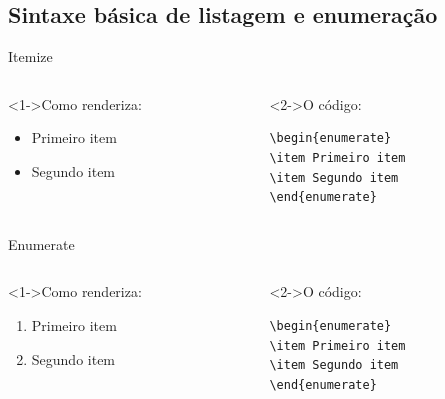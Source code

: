 \documentclass[bigger]{beamer}
\begin{document}
\subsection{Sintaxe básica de listagem e enumeração}
\label{sec:org2bd4bd1}
\begin{frame}[label={sec:org839df62},fragile]{Itemize}
 \begin{columns}
\begin{column}{0.48\columnwidth}
\begin{block}<1->{Como renderiza:}
\begin{itemize}
\item Primeiro item
\item Segundo item
\end{itemize}
\end{block}
\end{column}

\begin{column}{0.48\columnwidth}
\begin{block}<2->{O código:}
\begin{verbatim}
\begin{enumerate}
\item Primeiro item
\item Segundo item
\end{enumerate}
\end{verbatim}
\end{block}
\end{column}
\end{columns}
\end{frame}


\begin{frame}[label={sec:orgb5285ec},fragile]{Enumerate}
 \begin{columns}
\begin{column}{0.48\columnwidth}
\begin{block}<1->{Como renderiza:}
\begin{enumerate}
\item Primeiro item
\item Segundo item
\end{enumerate}
\end{block}
\end{column}
\begin{column}{0.48\columnwidth}
\begin{block}<2->{O código:}
\begin{verbatim}
\begin{enumerate}
\item Primeiro item
\item Segundo item
\end{enumerate}
\end{verbatim}
\end{block}
\end{column}
\end{columns}
\end{frame}
\end{document}
